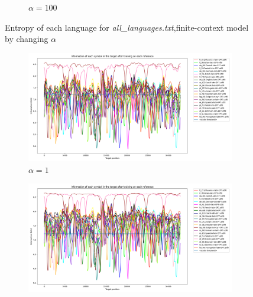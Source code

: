 \documentclass{article}
\begin{document}
\begin{figure}
\begin{subfigure}[b]{0.3\textwidth}
\begin{center}
        \end{center}
        \caption{$\alpha = 100$}
        \label{fig:all_languages_p_c:100:3}
    \end{subfigure}
    
    \caption{Entropy of each language for \textit{all\_languages.txt},finite-context model by changing $\alpha$}
    \label{fig:all_languages_p_c:alpha}
\end{figure}

\begin{figure}
    \begin{subfigure}[b]{0.3\textwidth}
        \begin{center}
            \includegraphics[width=1.0\linewidth]{../results/all_languages_random/-p_c:1:3.png}
        \end{center}
        \caption{$\alpha = 1$}
        \label{fig:all_languages_random_p_c:1:3_again}
    \end{subfigure}
    \hfill
    \begin{subfigure}[b]{0.3\textwidth}
        \begin{center}
            \includegraphics[width=1.0\linewidth]{../results/all_languages_random/-p_c:10:3.png}

\end{center}
\end{subfigure}
\end{figure}
\end{document}
